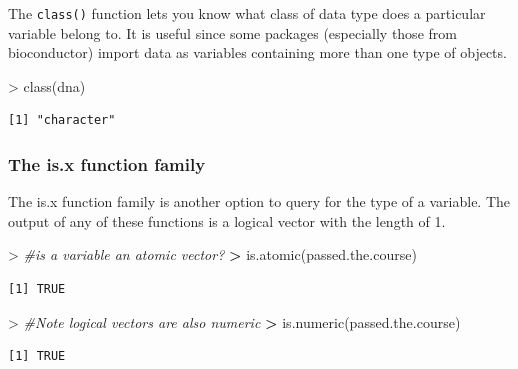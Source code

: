 \documentclass[
]{book}
\newenvironment{Shaded}{\begin{snugshade}}{\end{snugshade}}
\newcommand{\CommentTok}[1]{\textcolor[rgb]{0.56,0.35,0.01}{\textit{#1}}}
\newcommand{\ErrorTok}[1]{\textcolor[rgb]{0.64,0.00,0.00}{\textbf{#1}}}
\newcommand{\FunctionTok}[1]{\textcolor[rgb]{0.00,0.00,0.00}{#1}}
\newcommand{\NormalTok}[1]{#1}
\newcommand{\SpecialCharTok}[1]{\textcolor[rgb]{0.00,0.00,0.00}{#1}}
\theoremstyle{definition}
\theoremstyle{definition}
\theoremstyle{definition}
\theoremstyle{definition}
\theoremstyle{remark}
\begin{document}
The \texttt{class()} function lets you know what class of data type does a particular variable belong to.
It is useful since some packages (especially those from bioconductor) import data as variables containing more than
one type of objects.

\begin{Shaded}
\begin{Highlighting}[]
\SpecialCharTok{\textgreater{}} \FunctionTok{class}\NormalTok{(dna)}
\end{Highlighting}
\end{Shaded}

\begin{verbatim}
[1] "character"
\end{verbatim}

\hypertarget{the-is.x-function-family}{%
\subsubsection*{\texorpdfstring{\textbf{The is.x function family}}{The is.x function family}}\label{the-is.x-function-family}}

The is.x function family is another option to query for the type of a variable.
The output of any of these functions is a logical vector with the length of 1.

\begin{Shaded}
\begin{Highlighting}[]
\SpecialCharTok{\textgreater{}} \CommentTok{\#is a variable an atomic vector?}
\ErrorTok{\textgreater{}} \FunctionTok{is.atomic}\NormalTok{(passed.the.course)}
\end{Highlighting}
\end{Shaded}

\begin{verbatim}
[1] TRUE
\end{verbatim}

\begin{Shaded}
\begin{Highlighting}[]
\SpecialCharTok{\textgreater{}} \CommentTok{\#Note logical vectors are also numeric}
\ErrorTok{\textgreater{}} \FunctionTok{is.numeric}\NormalTok{(passed.the.course)}
\end{Highlighting}
\end{Shaded}

\begin{verbatim}
[1] TRUE
\end{verbatim}
\end{document}
